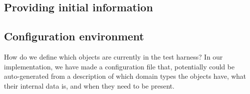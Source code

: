 \subsection{Providing initial information}

\subsection{Configuration environment}
How do we define which objects are currently in the test harness? In our implementation, we have made a configuration file that, potentially could be auto-generated from a description of which domain types the objects have, what their internal data is, and when they need to be present.

